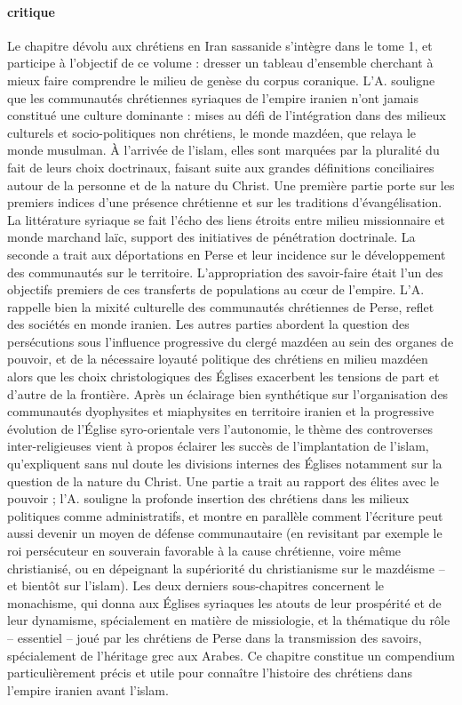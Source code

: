 \paragraph{critique} Le chapitre dévolu aux chrétiens en Iran sassanide s’intègre dans le tome 1, et participe à l’objectif de ce volume : dresser un tableau d’ensemble cherchant à mieux faire comprendre le milieu de genèse du corpus coranique. L’A. souligne que les communautés chrétiennes syriaques de l’empire iranien n’ont jamais constitué une culture dominante : mises au défi de l’intégration dans des milieux culturels et socio-politiques non chrétiens, le monde mazdéen, que relaya le monde musulman. À l’arrivée de l’islam, elles sont marquées par la pluralité du fait de leurs choix doctrinaux, faisant suite aux grandes définitions conciliaires autour de la personne et de la nature du Christ. Une première partie porte sur les premiers indices d’une présence chrétienne et sur les traditions d’évangélisation. La littérature syriaque se fait l’écho des liens étroits entre milieu missionnaire et monde marchand laïc, support des initiatives de pénétration doctrinale. La seconde a trait aux déportations en Perse et leur incidence sur le développement des communautés sur le territoire. L’appropriation des savoir-faire était l’un des objectifs premiers de ces transferts de populations au cœur de l’empire. L’A. rappelle bien la mixité culturelle des communautés chrétiennes de Perse, reflet des sociétés en monde iranien. Les autres parties abordent la question des persécutions sous l’influence progressive du clergé mazdéen au sein des organes de pouvoir, et de la nécessaire loyauté politique des chrétiens en milieu mazdéen alors que les choix christologiques des Églises exacerbent les tensions de part et d’autre de la frontière. Après un éclairage bien synthétique sur l’organisation des communautés dyophysites et miaphysites en territoire iranien et la progressive évolution de l’Église syro-orientale vers l’autonomie, le thème des controverses inter-religieuses vient à propos éclairer les succès de l’implantation de l’islam, qu’expliquent sans nul doute les divisions internes des Églises notamment sur la question de la nature du Christ. Une partie a trait au rapport des élites avec le pouvoir ; l’A. souligne la profonde insertion des chrétiens dans les milieux politiques comme administratifs, et montre en parallèle comment l’écriture peut aussi devenir un moyen de défense communautaire (en revisitant par exemple le roi persécuteur en souverain favorable à la cause chrétienne, voire même christianisé, ou en dépeignant la supériorité du christianisme sur le mazdéisme – et bientôt sur l’islam). Les deux derniers sous-chapitres concernent le monachisme, qui donna aux Églises syriaques les atouts de leur prospérité et de leur dynamisme, spécialement en matière de missiologie, et la thématique du rôle – essentiel – joué par les chrétiens de Perse dans la transmission des savoirs, spécialement de l’héritage grec aux Arabes. Ce chapitre constitue un compendium particulièrement précis et utile pour connaître l’histoire des chrétiens dans l’empire iranien avant l’islam.


